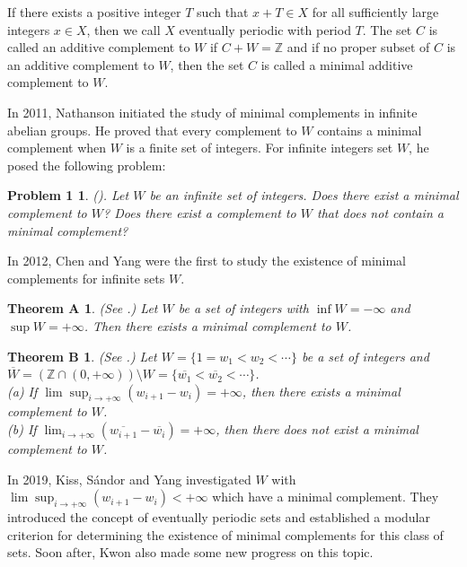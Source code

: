 \documentclass[12pt]{article}
\numberwithin{equation}{section}
\newtheorem*{problem1}{Problem 1}%
\newtheorem*{theoremA}{Theorem A}
\newtheorem*{theoremB}{Theorem B}
\begin{document}
If there exists a positive integer $T$ such that $x+T\in X$ for all sufficiently large integers $x\in X$, then we call $X$ eventually periodic with period $T$.
The set $C$ is called an additive complement to $W$ if $C+W=\mathbb{Z}$ and if no proper subset of $C$ is an additive complement to $W$, then the set $C$ is called a minimal additive complement to $W$.

In 2011, Nathanson \cite{N2011} initiated the study of minimal complements in infinite abelian groups. He proved that every complement to $W$ contains a minimal complement when $W$ is a finite set of integers. For infinite integers set $W$, he posed the following problem:

\begin{problem1}\label{prob1}(\cite[Problem 11]{N2011}). Let $W$ be an infinite set of integers. Does there exist a minimal complement to $W$? Does there exist a complement to $W$ that does not contain a minimal complement?
\end{problem1}

 In 2012, Chen and Yang \cite{CY2012} were the first to study the existence of minimal complements for infinite sets $W$.
\begin{theoremA}(See \cite[Theorem 1]{CY2012}.) Let $W$ be a set of integers with $\inf W=-\infty$ and $\sup W=+\infty$. Then there exists a minimal complement to $W$.
\end{theoremA}

\begin{theoremB} (See \cite[Theorem 2]{CY2012}.) Let $W=\{1=w_1<w_2<\cdots\}$ be a set of integers and $\overline{W}=(\mathbb{Z}\cap (0,+\infty))\setminus W=\{\overline{w_1}<\overline{w_2}<\cdots\}$.\\
(a) If $\lim\sup_{i\rightarrow+\infty}(w_{i+1}-w_i)=+\infty$, then there exists a minimal complement to $W$.\\
(b) If $\lim_{i\rightarrow+\infty}(\overline{w_{i+1}}-\overline{w_i})=+\infty$, then there does not exist a minimal complement to $W$.
\end{theoremB}


In 2019, Kiss, S\'{a}ndor and Yang \cite{KSY2019} investigated $W$ with
$\lim\sup_{i\rightarrow+\infty}(w_{i+1}-w_i)<+\infty$ which have a minimal complement.
They introduced the concept of eventually periodic sets
and established a modular criterion for determining the existence of minimal complements for this class of sets. Soon after, Kwon \cite{K2019} also made some new progress on this topic.
\end{document}
